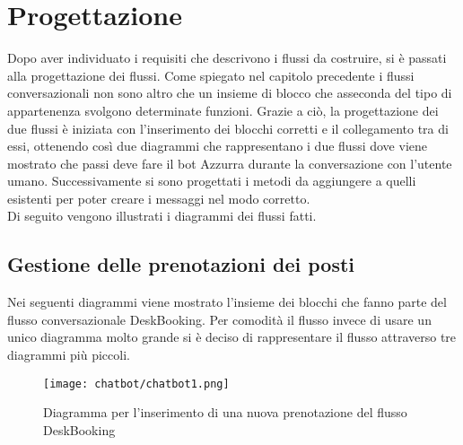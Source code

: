 \section{Progettazione}
Dopo aver individuato i requisiti che descrivono i flussi da costruire, si è passati alla progettazione dei flussi. Come spiegato nel capitolo precedente i flussi conversazionali non sono altro che un insieme di blocco che asseconda del tipo di appartenenza svolgono determinate funzioni. Grazie a ciò, la progettazione dei due flussi è iniziata con l'inserimento dei blocchi corretti e il collegamento tra di essi, ottenendo così due diagrammi che rappresentano i due flussi dove viene mostrato che passi deve fare il \gls{bot}\ap{[G]} Azzurra durante la conversazione con l'utente umano. Successivamente si sono progettati i metodi da aggiungere a quelli esistenti per poter creare i messaggi nel modo corretto.\\
Di seguito vengono illustrati i diagrammi dei flussi fatti.

\subsection{Gestione delle prenotazioni dei posti}
Nei seguenti diagrammi viene mostrato l'insieme dei blocchi che fanno parte del flusso conversazionale DeskBooking. Per comodità il flusso invece di usare un unico diagramma molto grande si è deciso di rappresentare il flusso attraverso tre diagrammi più piccoli.

\begin{figure}[h]
	\centering
	\texttt{[image: chatbot/chatbot1.png]}
	\caption{Diagramma per l'inserimento di una nuova prenotazione del flusso DeskBooking}\label{fig:ins}
\end{figure}

